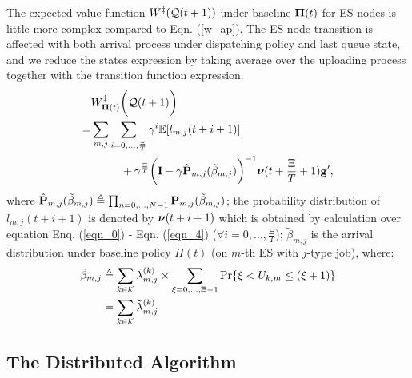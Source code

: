 The expected value function $W^{\ddagger}(\mathcal{Q}({t+1}))$ under baseline $\boldsymbol{\Pi}({t})$ for ES nodes is little more complex compared to Eqn. (\ref{w_ap}).
The ES node transition is affected with both arrival process under dispatching policy and last queue state, and we reduce the states expression by taking average over the uploading process together with the transition function expression.
\begin{align}
    &W^{\ddagger}_{\boldsymbol{\Pi}({t})}\bigg(\mathcal{Q}({t+1})\bigg)
    \nonumber\\
    =& \sum_{m,j}\sum_{i=0,\dots,\frac{\Xi}{T}} \gamma^{i} \mathbb{E}[ l_{m,j}({t+i+1}) ]
    \nonumber\\
    &~~~~~~~~+ \gamma^{\frac{\Xi}{T}} \bigg( \mathbf{I} - \gamma \hat{\mathbf{P}}_{m,j}(\tilde{\beta}_{m,j}) \bigg)^{-1} \boldsymbol{\nu}({t+\frac{\Xi}{T}+1}) \mathbf{g}',
\end{align}
where $\hat{\mathbf{P}}_{m,j}(\tilde{\beta}_{m,j}) \triangleq \prod_{n=0,\dots,N-1} \mathbf{P}_{m,j}(\tilde{\beta}_{m,j})$;
the probability distribution of $l_{m,j}({t+i+1})$ is denoted by $\boldsymbol{\nu}({t+i+1})$ which is obtained by calculation over equation Enq. (\ref{eqn_0}) - Eqn. (\ref{eqn_4}) ($\forall i=0,\dots,\frac{\Xi}{T}$);
$\tilde{\beta}_{m,j}$ is the arrival distribution under baseline policy $\Pi({t})$ (on $m$-th ES with $j$-type job), where:
\begin{align}
    \tilde{\beta}_{m,j} &\triangleq \sum_{k\in\mathcal{K}} \tilde{\lambda}^{(k)}_{m,j} \times \sum_{\xi=0,\dots,\Xi-1} \Pr\{ \xi<U_{k,m}\leq(\xi+1) \}
        \nonumber\\
    ~~~~&= \sum_{k\in\mathcal{K}} \tilde{\lambda}^{(k)}_{m,j}
\end{align}

\subsection{The Distributed Algorithm}

